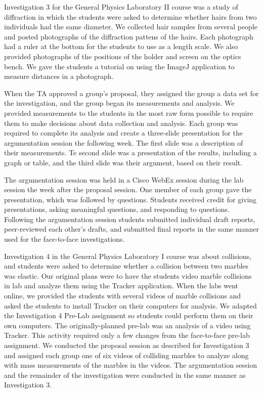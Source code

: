 \documentclass[aip, preprint, numerical]{revtex4-2}
\begin{document}
Investigation 3 for the General Physics Laboratory II course was a study of diffraction in which the students were asked to determine whether hairs from two individuals had the same diameter. We collected hair samples from several people and posted photographs of the diffraction pattens of the hairs. Each photograph had a ruler at the bottom for the students to use as a length scale. We also provided photographs of the positions of the holder and screen on the optics bench. We gave the students a tutorial on using the ImageJ application\citep{schrasetal12} to measure distances in a photograph.

When the TA approved a group's  proposal, they assigned the group a data set for the investigation, and the group began its measurements and analysis. We provided measurements to the students in the most raw form possible to require them to make decisions about data collection and analysis. Each group was required to complete its analysis and create a three-slide presentation for the argumentation session the following week. The first slide was a description of their measurements. Te second slide was a presentation of the results, including a graph or table, and the third slide was their argument, based on their result.

The argumentation session was held in a Cisco WebEx session during the lab session the week after the proposal session. One member of each group gave the presentation, which  was followed by questions. Students received credit for giving presentations, asking meaningful questions, and responding to questions.  Following the argumentation session students submitted individual draft reports, peer-reviewed each other's drafts, and submitted final reports in the same manner used for the face-to-face investigations.

Investigation 4 in the General Physics Laboratory I course was about collisions, and students were asked to determine whether a collision between two marbles was elastic. Our original plans were to have the students video marble collisions in lab and analyze them using the Tracker application\citep{bro2009}. When the labs went online, we provided the students with several videos of marble collisions and asked the students to install Tracker on their computers for analysis.  We adapted the Investigation 4 Pre-Lab assignment so students could perform them on their own computers. The originally-planned pre-lab was an analysis of a video using Tracker. This activity required only a few changes from the face-to-face pre-lab assignment. We conducted the proposal session as described for Investigation 3 and assigned each group one of six videos of colliding marbles to analyze along with mass measurements of the marbles in the videos. The argumentation session and the remainder of the investigation were conducted in the same manner as Investigation 3.
\end{document}
